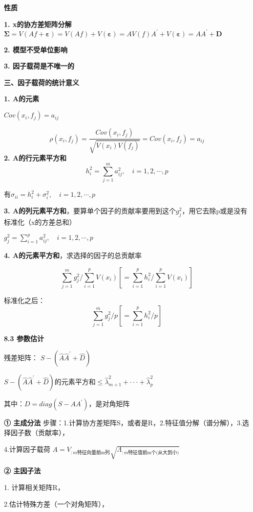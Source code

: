\documentclass[10pt,a4paper]{ctexart} %
\begin{document}
\begin{multicols*}{3}
		\textbf{性质}
		
		\textbf{1. x的协方差矩阵分解}
		$\boldsymbol{\Sigma}=V\left(Af+\boldsymbol{\varepsilon}\right)=V\left(Af\right)+V\left(\boldsymbol{\varepsilon}\right)=AV\left(f\right)A^{\prime}+V\left(\boldsymbol{\varepsilon}\right)=AA^{\prime}+\boldsymbol{D}$
		
		\textbf{2. 模型不受单位影响}
		
		\textbf{3. 因子载荷是不唯一的}
		
		\textbf{三、因子载荷的统计意义}
		
		\textbf{1. A的元素}
		
		$Cov(x_i,f_j)=a_{ij}$
		
		$$\rho\left(x_{i},f_{j}\right)=\frac{Cov\left(x_{i},f_{j}\right)}{\sqrt{V\left(x_{i}\right)V\left(f_{j}\right)}}=Cov\left(x_{i},f_{j}\right)=a_{ij}$$
		\textbf{2. A的行元素平方和}
		$$h_{i}^{2}=\sum_{j=1}^{m}a_{ij}^{2},\quad i=1,2,\cdots,p$$
		
		有$\sigma_{ii}=h_{i}^{2}+\sigma_{i}^{2},\quad i=1,2,\cdots,p$
		
		\textbf{3. A的列元素平方和}，要算单个因子的贡献率要用到这个$g_j^2$，用它去除p或是没有标准化（x的方差总和）
		
		$g_{j}^{2}=\sum_{i=1}^{p}a_{ij}^{2},\quad i=1,2,\cdots,p$
		
		\textbf{4. A的元素平方和}，求选择的因子的总贡献率
		
		$$\sum_{j=1}^{m}g_{j}^{2}/\sum_{i=1}^{p}V(x_{i})\left[=\sum_{i=1}^{p}h_{i}^{2}/\sum_{i=1}^{p}V(x_{i})\right]$$
		
		标准化之后：
		$$\sum_{j=1}^{m}g_{j}^{2}/p\left[=\sum_{i=1}^{p}h_{i}^{2} / p\right]$$
		
		\textbf{8.3 参数估计}
		
		残差矩阵：
		$S-\left(\hat{A}\hat{A}^{\prime}+\hat{D}\right)$
		
		$S-(\hat{A}\hat{A}^{\prime}+\hat{D})\text{的元素平方和}\leqslant\hat{\lambda}_{m+1}^2+\cdotp\cdotp\cdotp+\hat{\lambda}_p^2$
		
		其中：$D = diag(S-AA^{\prime})$，是对角矩阵
		
		\textbf{① 主成分法}
		步骤：1.计算协方差矩阵S，或者是R，2.特征值分解（谱分解），3.选择因子数（贡献率），
		
		4.计算因子载荷
		$A=V_{:m\text{特征向量前m列}}\sqrt{\Lambda_{:m\text{特征值前m个(从大到小)}}}$
		
		\textbf{② 主因子法}
		
		1. 计算相关矩阵R，
		
		2.估计特殊方差（一个对角矩阵），
		

\end{multicols*}
\end{document}
